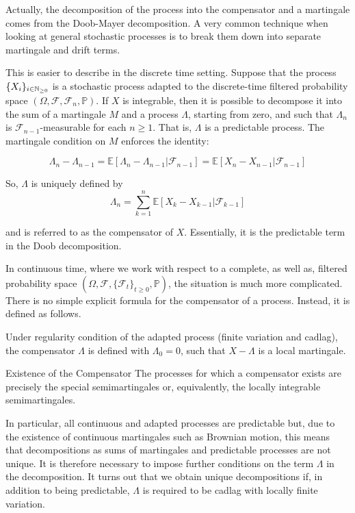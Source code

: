 \documentclass[11pt]{book}
\newcommand{\sequence}[1]{\{ #1 \}_{ i \in \N} }
\begin{document}
Actually, the decomposition of the process into the compensator and a martingale comes from the Doob-Mayer decomposition. A very common technique when looking at general stochastic processes is to break them down into separate martingale and drift terms.

This is easier to describe in the discrete time setting. Suppose that the process $\sequence{X_i}$  is a stochastic process adapted to the discrete-time filtered probability space  $(\Omega, \mathcal F, \mathcal F_n, \mathbb P )$. If $X$ is integrable, then it is possible to decompose it into the sum of a martingale $M$ and a process $\Lambda$, starting from zero, and such that $\Lambda_n$ is $\mathcal{F}_{n-1}$-measurable for each $n\ge1$. That is, $\Lambda$ is a predictable process. The martingale condition on $M$ enforces the identity:

\begin{equation}
\Lambda_n-\Lambda_{n-1}={\mathbb E}[\Lambda_n-\Lambda_{n-1}\vert\mathcal{F}_{n-1}]={\mathbb E}[X_n-X_{n-1}\vert\mathcal{F}_{n-1}]
\end{equation}

So, $\Lambda$ is uniquely defined by
\begin{equation}
\Lambda_n=\sum_{k=1}^n{\mathbb E}\left[X_k-X_{k-1}\vert\mathcal{F}_{k-1}\right]
\end{equation}

and is referred to as the compensator of $X$. Essentially, it is the predictable term in the Doob decomposition.


In continuous time, where we work with respect to a complete, as well as, filtered probability space $(\Omega,\mathcal{F},\{\mathcal{F}_t\}_{t\ge0},{\mathbb P})$, the situation is much more complicated. There is no simple explicit formula for the compensator of a process. Instead, it is defined as follows.

Under regularity condition of the adapted process (finite variation and cadlag), the compensator $\Lambda $ is defined with $\Lambda_0=0$, such that $X-\Lambda$ is a local martingale. 


\begin{theoreme}{Existence of the Compensator}
The processes for which a compensator exists are precisely the special semimartingales or, equivalently, the locally integrable semimartingales. 
\end{theoreme}

In particular, all continuous and adapted processes are predictable but, due to the existence of continuous martingales such as Brownian motion, this means that decompositions as sums of martingales and predictable processes are not unique. It is therefore necessary to impose further conditions on the term $\Lambda$ in the decomposition. It turns out that we obtain unique decompositions if, in addition to being predictable, $\Lambda$ is required to be cadlag with locally finite variation. 
\end{document}
